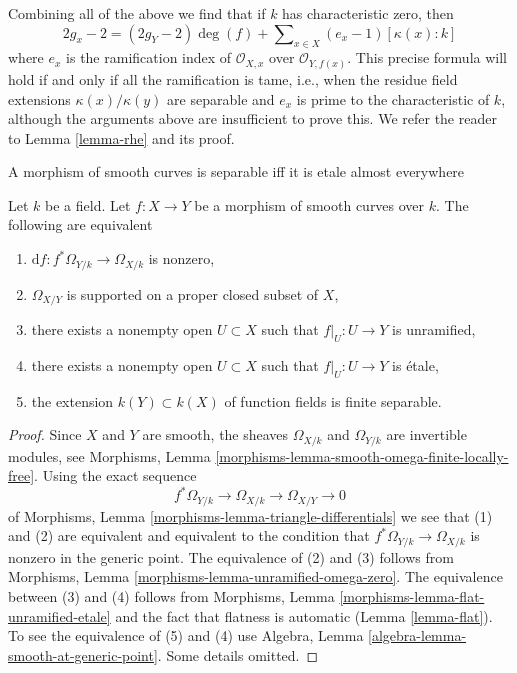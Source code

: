 \medskip\noindent
Combining all of the above we find that if $k$ has characteristic
zero, then
$$
2g_x - 2 = (2g_Y - 2)\deg(f) +
\sum\nolimits_{x \in X} (e_x - 1)[\kappa(x) : k]
$$
where $e_x$ is the ramification index of $\mathcal{O}_{X, x}$ over
$\mathcal{O}_{Y, f(x)}$. This precise formula will hold if and only
if all the ramification is tame, i.e., when the
residue field extensions $\kappa(x)/\kappa(y)$ are separable and
$e_x$ is prime to the characteristic of $k$, although the
arguments above are insufficient to prove this. We refer the reader
to Lemma \ref{lemma-rhe} and its proof.

\begin{lemma}
\label{lemma-generically-etale}
\begin{slogan}
A morphism of smooth curves is separable iff it is etale almost everywhere
\end{slogan}
Let $k$ be a field. Let $f : X \to Y$ be a morphism of smooth curves over $k$.
The following are equivalent
\begin{enumerate}
\item $\text{d}f : f^*\Omega_{Y/k} \to \Omega_{X/k}$ is nonzero,
\item $\Omega_{X/Y}$ is supported on a proper closed subset of $X$,
\item there exists a nonempty open $U \subset X$ such that
$f|_U : U \to Y$ is unramified,
\item there exists a nonempty open $U \subset X$ such that
$f|_U : U \to Y$ is \'etale,
\item the extension $k(Y) \subset k(X)$ of function fields is
finite separable.
\end{enumerate}
\end{lemma}

\begin{proof}
Since $X$ and $Y$ are smooth, the sheaves $\Omega_{X/k}$ and
$\Omega_{Y/k}$ are invertible modules, see
Morphisms, Lemma \ref{morphisms-lemma-smooth-omega-finite-locally-free}.
Using the exact sequence
$$
f^*\Omega_{Y/k} \longrightarrow \Omega_{X/k}
\longrightarrow \Omega_{X/Y} \longrightarrow 0
$$
of Morphisms, Lemma \ref{morphisms-lemma-triangle-differentials}
we see that (1) and (2) are equivalent and equivalent to the
condition that $f^*\Omega_{Y/k} \to \Omega_{X/k}$ is nonzero
in the generic point. The equivalence of (2) and (3) follows
from Morphisms, Lemma \ref{morphisms-lemma-unramified-omega-zero}.
The equivalence between (3) and (4) follows from
Morphisms, Lemma \ref{morphisms-lemma-flat-unramified-etale}
and the fact that flatness is automatic
(Lemma \ref{lemma-flat}).
To see the equivalence of (5) and (4)
use Algebra, Lemma \ref{algebra-lemma-smooth-at-generic-point}.
Some details omitted.
\end{proof}

